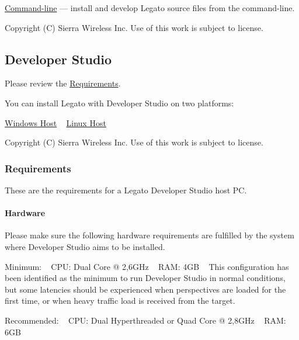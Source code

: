 \hyperlink{getstartedCLinstallMain}{Command-\/line} --- install and develop Legato source files from the command-\/line.





Copyright (C) Sierra Wireless Inc. Use of this work is subject to license. \hypertarget{getstartedDSinstall}{}\subsection{Developer Studio}\label{getstartedDSinstall}
Please review the \hyperlink{getstartedDSrequirements}{Requirements}.

You can install Legato with Developer Studio on two platforms\+:

\hyperlink{getstartedDSwindows}{Windows Host} ~\newline
 \hyperlink{getstartedDSlinux}{Linux Host}





Copyright (C) Sierra Wireless Inc. Use of this work is subject to license. \hypertarget{getstartedDSrequirements}{}\subsubsection{Requirements}\label{getstartedDSrequirements}
These are the requirements for a Legato Developer Studio host P\+C.\hypertarget{getstarted_d_srequirements_getstartedDSrequirements_hardware}{}\paragraph{Hardware}\label{getstarted_d_srequirements_getstartedDSrequirements_hardware}
Please make sure the following hardware requirements are fulfilled by the system where Developer Studio aims to be installed.

Minimum\+: ~\newline
 C\+P\+U\+: Dual Core @ 2,6\+G\+Hz ~\newline
 R\+A\+M\+: 4\+G\+B ~\newline
 This configuration has been identified as the minimum to run Developer Studio in normal conditions, but some latencies should be experienced when perspectives are loaded for the first time, or when heavy traffic load is received from the target.

Recommended\+: ~\newline
 C\+P\+U\+: Dual Hyperthreaded or Quad Core @ 2,8\+G\+Hz ~\newline
 R\+A\+M\+: 6\+G\+B ~\newline


